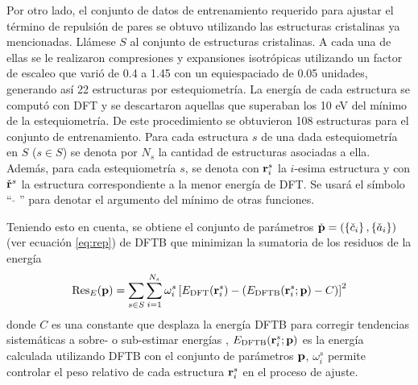 Por otro lado, el conjunto de datos de entrenamiento requerido para ajustar el 
término de repulsión de pares se obtuvo utilizando las estructuras cristalinas 
ya mencionadas. Llámese $S$ al conjunto de estructuras cristalinas. A cada una de 
ellas se le realizaron compresiones y expansiones isotrópicas utilizando un 
factor de escaleo que varió de 0.4 a 1.45 con un equiespaciado de 0.05 unidades, 
generando así 22 estructuras por estequiometría. La energía de cada estructura se 
computó con DFT y se descartaron aquellas que superaban los 10 eV del mínimo de 
la estequiometría. De este procedimiento se obtuvieron 108 estructuras para el 
conjunto de entrenamiento. Para cada estructura $s$ de una dada estequiometría 
en $S$ ($s \in S$) se denota por $N_s$ la cantidad de estructuras asociadas a 
ella. Además, para cada estequiometría $s$, se denota con ${\bf r}^s_i$ la 
$i$-esima estructura y con $\check{{\bf r}}^s$ la estructura correspondiente a la
menor energía de DFT. Se usará el símbolo ``$\ \check{\ }\ $'' para denotar 
el argumento del mínimo de otras funciones.

Teniendo esto en cuenta, se obtiene el conjunto de parámetros 
$\check{\bf p} = \left( \left\{\check{c}_i\right\}, \left\{\check{a}_i\right\}\right)$ 
(ver ecuación \ref{eq:rep}) de DFTB que minimizan la sumatoria de los residuos 
de la energía
\begin{equation}\label{eq:e_res}
    \text{Res}_E({\bf p})=\sum_{s\in S}\sum_{i=1}^{N_s} \omega^s_i
    \left[E_{\text{DFT}}({\bf r}^s_i)-(E_{\text{DFTB}}({\bf r}^s_i;{\bf p})-C)\right]^2
\end{equation}
donde $C$ es una constante que desplaza la energía DFTB para corregir tendencias
sistemáticas a sobre- o sub-estimar energías \cite{van2018, van2019}, 
$E_{\text{DFTB}}({\bf r}^s_i;{\bf p})$ es la energía calculada utilizando DFTB con 
el conjunto de parámetros ${\bf p}$, $\omega_i^s$ permite controlar el peso 
relativo de cada estructura ${\bf r}^s_i$ en el proceso de ajuste.

